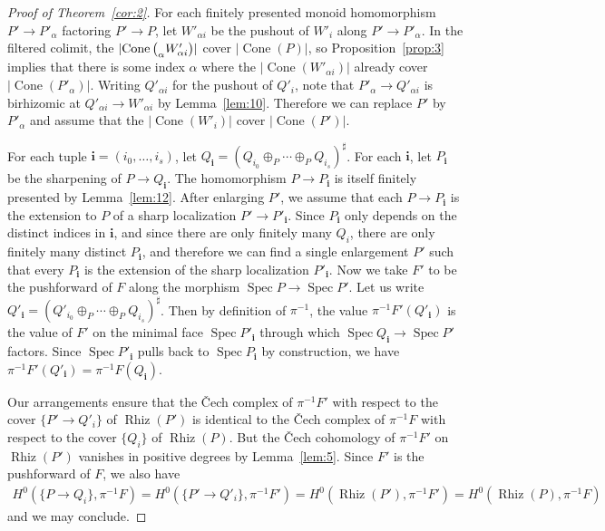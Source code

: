 \documentclass[10pt]{article}
\numberwithin{equation}{section}
\theoremstyle{definition}
\theoremstyle{remark}
\def\Cone{\operatorname{Cone}}
\def\Spec{\operatorname{Spec}}
\def\spec{\Spec}
\def\Rh{\operatorname{Rhiz}}
\let \varinjlim \relax
\DeclareMathOperator*{\varinjlim}{colim}
\begin{document}
\begin{proof}[Proof of Theorem~\ref{cor:2}]
	For each finitely presented monoid homomorphism $P' \to P'_\alpha$ factoring $P' \to P$, let $W'_{\alpha i}$ be the pushout of $W'_i$ along $P' \to P'_\alpha$.  In the filtered colimit, the $\lvert \Cone\big( \varinjlim_\alpha W'_{\alpha i} \bigr) \rvert$ cover $\lvert \Cone(P) \rvert$, so Proposition~\ref{prop:3} implies that there is some index $\alpha$ where the $\lvert \Cone ( W'_{\alpha i} )\rvert$ already cover $\lvert \Cone(P'_\alpha) \rvert$.  Writing $Q'_{\alpha i}$ for the pushout of $Q'_i$, note that $P'_\alpha \to Q'_{\alpha i}$ is birhizomic at $Q'_{\alpha i} \to W'_{\alpha i}$ by Lemma~\ref{lem:10}.  Therefore we can replace $P'$ by $P'_\alpha$ and assume that the $\lvert\Cone(W'_i)\rvert$ cover $\lvert \Cone(P') \rvert$.




	For each tuple $\mathbf i = (i_0, \ldots, i_s)$, let $Q_{\mathbf i} = (Q_{i_0} \oplus_P \cdots \oplus_P Q_{i_s})^\sharp$.  For each $\mathbf i$, let $P_{\mathbf i}$ be the sharpening of $P \to Q_{\mathbf i}$.  The homomorphism $P \to P_{\mathbf i}$ is itself finitely presented by Lemma~\ref{lem:12}.  After enlarging $P'$, we assume that each $P \to P_{\mathbf i}$ is the extension to $P$ of a sharp localization $P' \to P'_{\mathbf i}$.  Since $P_{\mathbf i}$ only depends on the distinct indices in $\mathbf i$, and since there are only finitely many $Q_i$, there are only finitely many distinct $P_{\mathbf i}$, and therefore we can find a single enlargement $P'$ such that every $P_{\mathbf i}$ is the extension of the sharp localization $P'_{\mathbf i}$.  Now we take $F'$ to be the pushforward of $F$ along the morphism $\spec P \to \spec P'$.  Let us write $Q'_{\mathbf i} = (Q'_{i_0} \oplus_P \cdots \oplus_P Q_{i_s})^\sharp$.  Then by definition of $\pi^{-1}$, the value $\pi^{-1} F'(Q'_{\mathbf i})$ is the value of $F'$ on the minimal face $\spec P'_{\mathbf i}$ through which $\spec Q_{\mathbf i} \to \spec P'$ factors. Since $\spec P'_{\mathbf i}$ pulls back to $\spec P_{\mathbf i}$ by construction, we have $\pi^{-1} F'(Q'_{\mathbf i}) = \pi^{-1} F(Q_{\mathbf i})$.




	
	Our arrangements ensure that the \v Cech complex of $\pi^{-1} F'$ with respect to the cover $\{ P' \to Q'_i \}$ of $\Rh(P')$ is identical to the \v Cech complex of $\pi^{-1} F$ with respect to the cover $\{ Q_i \}$ of $\Rh(P)$.  But the \v Cech cohomology of $\pi^{-1} F'$ on $\Rh(P')$ vanishes in positive degrees by Lemma~\ref{lem:5}.  Since $F'$ is the pushforward of $F$, we also have
	\begin{multline*}
		H^0(\{ P \to Q_i \}, \pi^{-1} F) = H^0(\{ P' \to Q'_i \}, \pi^{-1} F') = H^0(\Rh(P'), \pi^{-1} F') = H^0(\Rh(P), \pi^{-1} F)
	\end{multline*}
	and we may conclude.
\end{proof}
\end{document}
